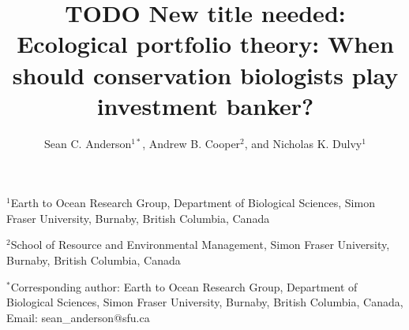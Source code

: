\documentclass[12pt]{article}
\title{TODO New title needed: Ecological portfolio theory:
  When should conservation biologists play investment banker?}
\author{Sean C. Anderson$^{1\ast}$,
  Andrew B. Cooper$^2$,
  and Nicholas K. Dulvy$^1$}
\date{}
\begin{document}
\maketitle
\noindent
$^1$Earth to Ocean Research Group,
Department of Biological Sciences,
Simon Fraser University,
Burnaby, British Columbia, Canada

\noindent
$^2$School of Resource and Environmental Management,
Simon Fraser University,
Burnaby, British Columbia, Canada

\noindent
$^{\ast}$Corresponding author:
Earth to Ocean Research Group,
Department of Biological Sciences,
Simon Fraser University,
Burnaby, British Columbia, Canada,
Email: sean\_anderson@sfu.ca



\clearpage
\begin{spacing}{1.3}



\clearpage

\clearpage


\end{spacing}
\end{document}
